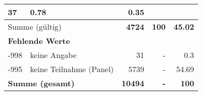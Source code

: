 \begin{longtable}{lXrrr}
       \num{37} &
       \num[round-mode=places,round-precision=2]{0,78} &
         \num[round-mode=places,round-precision=2]{0,35} \\
     \midrule
     \multicolumn{2}{l}{Summe (gültig)} &
       \textbf{\num{4724}} &
     \textbf{100} &
       \textbf{\num[round-mode=places,round-precision=2]{45,02}} \\
     \multicolumn{5}{l}{\textbf{Fehlende Werte}}\\
       -998 &
       keine Angabe &
         \num{31} &
        - &
         \num[round-mode=places,round-precision=2]{0,3} \\
       -995 &
       keine Teilnahme (Panel) &
         \num{5739} &
        - &
         \num[round-mode=places,round-precision=2]{54,69} \\
     \midrule
     \multicolumn{2}{l}{\textbf{Summe (gesamt)}} &
          \textbf{\num{10494}} &
        \textbf{-} &
        \textbf{100} \\
     \bottomrule
     \end{longtable}
     
